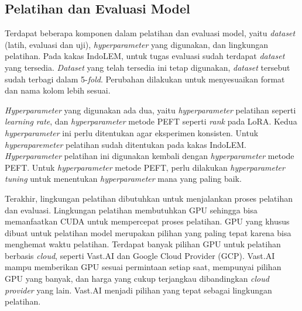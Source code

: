 \subsection{Pelatihan dan Evaluasi Model}

Terdapat beberapa komponen dalam pelatihan dan evaluasi model, yaitu \textit{dataset} (latih, evaluasi dan uji), \textit{hyperparameter} yang digunakan, dan lingkungan pelatihan. Pada kakas IndoLEM, untuk tugas evaluasi \nlptask sudah terdapat \textit{dataset} yang tersedia. \textit{Dataset} yang telah tersedia ini tetap digunakan, \textit{dataset} tersebut sudah terbagi dalam 5-\textit{fold}. Perubahan dilakukan untuk menyesuaikan format dan nama kolom  lebih sesuai.

\textit{Hyperparameter} yang digunakan ada dua, yaitu \textit{hyperparameter} pelatihan seperti \textit{learning rate}, dan \textit{hyperparameter} metode PEFT seperti \textit{rank} pada LoRA. Kedua \textit{hyperparameter} ini perlu ditentukan agar eksperimen konsisten. Untuk \textit{hyperaparemeter} pelatihan sudah ditentukan pada kakas IndoLEM. \textit{Hyperparameter} pelatihan ini digunakan kembali dengan \textit{hyperparameter} metode PEFT. Untuk \textit{hyperparameter} metode PEFT, perlu dilakukan \textit{hyperparameter tuning} untuk menentukan \textit{hyperparameter} mana yang paling baik.

Terakhir, lingkungan pelatihan dibutuhkan untuk menjalankan proses pelatihan dan evaluasi. Lingkungan pelatihan membutuhkan GPU sehingga bisa memanfaatkan CUDA untuk mempercepat proses pelatihan. GPU yang khusus dibuat untuk pelatihan model merupakan pilihan yang paling tepat karena bisa menghemat waktu pelatihan. Terdapat banyak pilihan GPU untuk pelatihan berbasis \textit{cloud}, seperti Vast.AI dan Google Cloud Provider (GCP). Vast.AI mampu memberikan GPU sesuai permintaan setiap saat, mempunyai pilihan GPU yang banyak, dan harga yang cukup terjangkau dibandingkan \textit{cloud provider} yang lain. Vast.AI menjadi pilihan yang tepat sebagai lingkungan pelatihan.


